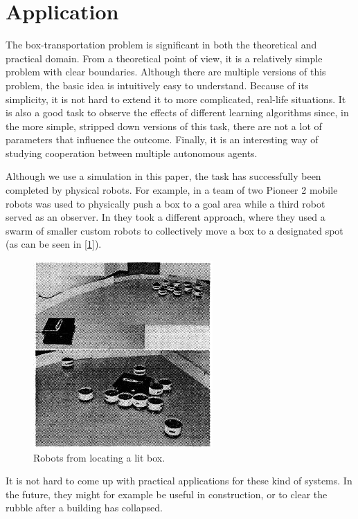 \section{Application}
The box-transportation problem is significant in both the theoretical and practical domain. From a theoretical point of view, it is a relatively simple problem with clear boundaries. Although there are multiple versions of this problem, the basic idea is intuitively easy to understand. Because of its simplicity, it is not hard to extend it to more complicated, real-life situations. It is also a good task to observe the effects of different learning algorithms since, in the more simple, stripped down versions of this task, there are not a lot of parameters that influence the outcome. Finally, it is an interesting way of studying cooperation between multiple autonomous agents.

 Although we use a simulation in this paper, the task has successfully been completed by physical robots. For example, in \cite{mataric2002} a team of two Pioneer 2 mobile robots was used to physically push a box to a goal area while a third robot served as an observer. In \cite{kube1996} they took a different approach, where they used a swarm of smaller custom robots to collectively move a box to a designated spot (as can be seen in \ref{1}).
\begin{figure}
	\centering
	\includegraphics{images/swarmPushing.png}
	\caption{Robots from \cite{kube1996} locating a lit box.}
	\label{fig:robots}
\end{figure}
It is not hard to come up with practical applications for these kind of systems. In the future, they might for example be useful in construction, or to clear the rubble after a building has collapsed.\\
